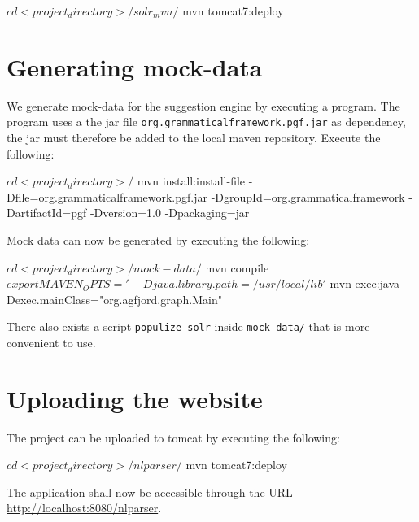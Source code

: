 \begin{terminal}
$ cd <project_directory>/solr_mvn/
$ mvn tomcat7:deploy
\end{terminal}

\section{Generating mock-data}
We generate mock-data for the suggestion engine by executing a program. The program uses a the jar file \texttt{org.grammaticalframework.pgf.jar} as dependency, the jar must therefore be added to the local maven repository. Execute the following:

\begin{terminal}
$ cd <project_directory>/
$ mvn install:install-file -Dfile=org.grammaticalframework.pgf.jar 
                           -DgroupId=org.grammaticalframework 
                           -DartifactId=pgf -Dversion=1.0 -Dpackaging=jar
\end{terminal}

Mock data can now be generated by executing the following:


\begin{terminal}
$ cd <project_directory>/mock-data/
$ mvn compile
$ export MAVEN_OPTS='-Djava.library.path=/usr/local/lib'
$ mvn exec:java -Dexec.mainClass="org.agfjord.graph.Main"
\end{terminal}

There also exists a script \texttt{populize\_solr} inside \texttt{mock-data/} that is more convenient to use.

\section{Uploading the website}

The project can be uploaded to tomcat by executing the following:

\begin{terminal}
$ cd <project_directory>/nlparser/
$ mvn tomcat7:deploy
\end{terminal}

The application shall now be accessible through the URL
\newline
 \url{http://localhost:8080/nlparser}.
